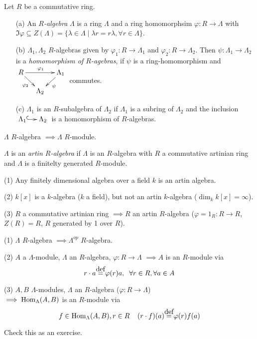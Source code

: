 Let $R$ be a commutative ring.
\begin{defin}
\begin{enumerate}
\item[(a)] An \emph{$R$-algebra} $\Lambda$ is a ring $\Lambda$ and a
  ring homomorphsim $\varphi\colon  R \to \Lambda$ with $\Im \varphi
  \subseteq Z(\Lambda) = \{ \lambda \in \Lambda \mid \lambda
  r=r\lambda, \forall r \in \Lambda \}$. 

\item[(b)] $\Lambda_1, \Lambda_2$ $R$-algebras given by $\varphi_1
  \colon  R \to \Lambda_1$ and $\varphi_2 \colon  R \to
  \Lambda_2$. Then $\psi \colon   \Lambda_1 \to \Lambda_2$ is a
  \emph{homomorphism of $R$-agebras}, if $\psi$ is a ring-homomorphism and
  $\vcenter{\xymatrix@R-1pc@C-1pc{ 
R \ar[rr]^{\varphi_1} \ar[dr]_{\varphi_2} && \Lambda_1 \ar[dl]^{\psi}\\
&\Lambda_2&
}}$ commutes.

\item[(c)] $\Lambda_1$ is an $R$-subalgebra of $\Lambda_2$ if
  $\Lambda_1$ is a subring of $\Lambda_2$ and the inclusion
  $\xymatrix@C-1pc{\Lambda_1 \ar@{^{(}->}[r] & \Lambda_2}$ is a
  homomorphism of $R$-algebras. 
\end{enumerate}
\end{defin}

\begin{note}
$\Lambda$ $R$-algebra $\implies \Lambda$ $R$-module.
\end{note}

\begin{defin}
$\Lambda$ is an \emph{artin $R$-algebra} if $\Lambda$ is an
$R$-algebra with $R$ a commutative artinian ring and $\Lambda$ is a
finitelty generated $R$-module. 
\end{defin}

\begin{exam}
(1) Any finitely dimensional algebra over a field $k$ is an artin algebra.

(2) $k[x]$ is a $k$-algebra ($k$ a field), but not an artin
$k$-algebra ($\dim_k k[x] = \infty$).

(3) $R$ a commutative artinian ring $\implies R$ an artin $R$-algebra
($\varphi = 1_R \colon R \to R$, $Z(R) = R$, $R$ generated by 1 over
$R$).
\end{exam}

\begin{note}
(1) $\Lambda$ $R$-algebra $\implies \Lambda^{op}$ $R$-algebra.

(2) $A$ a $\Lambda$-module, $\Lambda$ an $R$-algebra, $\varphi\colon
R \to \Lambda$ 
$\implies A$ is an $R$-module via \[r\cdot a
\stackrel{\mathclap{\normalfont\mbox{def}}}{=} \varphi(r)a, \;\;
\forall r \in R, \forall a \in A\] 


(3) $A,B$ $\Lambda$-modules, $\Lambda$ an $R$-algebra ($\varphi\colon R\to\Lambda$)\\
$\implies  \operatorname{Hom}_\Lambda(A,B)$ is an $R$-module via \[f \in  \Hom_\Lambda(A,B), r \in R \;\;\;\; (r \cdot f)(a) \stackrel{\mathclap{\normalfont\mbox{def}}}{=} \varphi(r)f(a)\]

Check this as an exercise.
\end{note}

